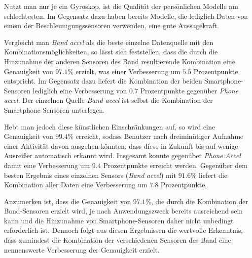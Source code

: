 Nutzt man nur je ein Gyroskop, ist die Qualität der persönlichen Modelle am schlechtesten. Im Gegensatz dazu haben bereits Modelle, die lediglich Daten von einem der Beschleunigungssensoren verwenden, eine gute Aussagekraft.

Vergleicht man \textit{Band accel} als die beste einzelne Datenquelle mit den Kombinationsmöglichkeiten, so lässt sich feststellen, dass die durch die Hinzunahme der anderen Sensoren des Band resultierende Kombination eine Genauigkeit von $97.1 \%$ erzielt, was einer Verbesserung um $5.5$ Prozentpunkte entspricht. Im Gegensatz dazu liefert die Kombination der beiden Smartphone-Sensoren lediglich eine Verbesserung von $0.7$ Prozentpunkte gegenüber \textit{Phone accel}. Der einzelnen Quelle \textit{Band accel} ist selbst die Kombination der Smartphone-Sensoren unterlegen.

Hebt man jedoch diese künstlichen Einschränkungen auf, so wird eine Genauigkeit von $99.4 \%$ erreicht, sodass Benutzer nach dreiminütiger Aufnahme einer Aktivität davon ausgehen könnten, dass diese in Zukunft bis auf wenige Ausreißer automatisch erkannt wird. Insgesamt konnte gegenüber \textit{Phone Accel} damit eine Verbesserung um $9.4$ Prozentpunkte erreicht werden. Gegenüber dem besten Ergebnis eines einzelnen Sensors (\textit{Band accel}) mit $91.6 \%$ liefert die Kombination aller Daten eine Verbesserung um $7.8$ Prozentpunkte.

Anzumerken ist, dass die Genauigkeit von $97.1 \%$, die durch die Kombination der Band-Sensoren erzielt wird, je nach Anwendungszweck bereits ausreichend sein kann und die Hinzunahme von Smartphone-Sensoren daher nicht unbedingt erforderlich ist. Dennoch folgt aus diesen Ergebnissen die wertvolle Erkenntnis, dass zumindest die Kombination der verschiedenen Sensoren des Band eine nennenswerte Verbesserung der Genauigkeit erzielt.

